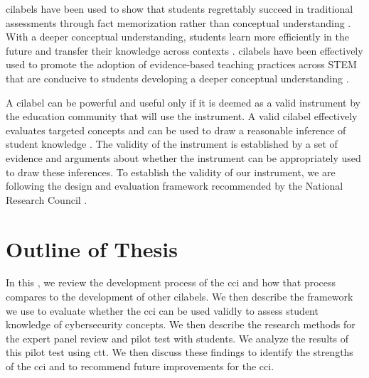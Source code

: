 \glspl{cilabel} have been used to show that students regrettably succeed in traditional assessments through fact memorization rather than conceptual understanding \cite{hake, fci, litzinger}. With a deeper conceptual understanding, students learn more efficiently in the future and transfer their knowledge across contexts \cite{litzinger}. \glspl{cilabel} have been effectively used to promote the adoption of evidence-based teaching practices across STEM that are conducive to students developing a deeper conceptual understanding \cite{hake, fci, ci_progress}.

A \gls{cilabel} can be powerful and useful only if it is deemed as a valid instrument by the education community that will use the instrument. A valid \gls{cilabel} effectively evaluates targeted concepts and can be used to draw a reasonable inference of student knowledge \cite{douglas_purzer}. The validity of the instrument is established by a set of evidence and arguments about whether the instrument can be appropriately used to draw these inferences. To establish the validity of our instrument, we are following the design and evaluation framework recommended by the National Research Council \cite{libarkin,knowing_what_students_know}. 

\section{Outline of Thesis}

In this \NoSpaceDocTitle, we review the development process of the \gls{cci} and how that process compares to the development of other \glspl{cilabel}. We then describe the framework we use to evaluate whether the \gls{cci} can be used validly to assess student knowledge of cybersecurity concepts. We then describe the research methods for the expert panel review and pilot test with students. We analyze the results of this pilot test using \gls{ctt}. We then discuss these findings to identify the strengths of the \gls{cci} and to recommend future improvements for the \gls{cci}.